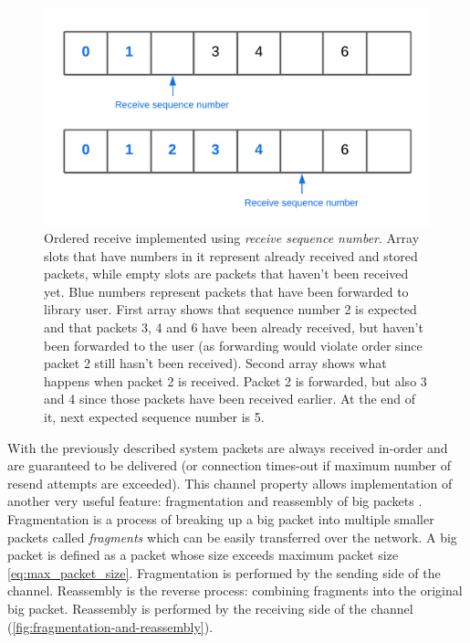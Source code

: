 \documentclass[times, utf8, diplomski]{fer}
\begin{document}
\begin{figure}[H]
	\centering
	\includegraphics[scale=0.25]{Ordered-receive}
	\caption{Ordered receive implemented using \textit{receive sequence number}. Array slots that have numbers in it represent already received and stored packets, while empty slots are packets that haven't been received yet. Blue numbers represent packets that have been forwarded to library user. First array shows that sequence number 2 is expected and that packets 3, 4 and 6 have been already received, but haven't been forwarded to the user (as forwarding would violate order since packet 2 still hasn't been received). Second array shows what happens when packet 2 is received. Packet 2 is forwarded, but also 3 and 4 since those packets have been received earlier. At the end of it, next expected sequence number is 5.}
	\label{fig:ordered-receive}
\end{figure}

With the previously described system packets are always received in-order and are guaranteed to be delivered (or connection times-out if maximum number of resend attempts are exceeded). This channel property allows implementation of another very useful feature: fragmentation and reassembly of big packets \cite{GafferOnGames:Sending-large-blocks-of-data}.\\

Fragmentation is a process of breaking up a big packet into multiple smaller packets called \textit{fragments} which can be easily transferred over the network. A big packet is defined as a packet whose size exceeds maximum packet size \eqref{eq:max_packet_size}. Fragmentation is performed by the sending side of the channel. Reassembly is the reverse process: combining fragments into the original big packet. Reassembly is performed by the receiving side of the channel (\ref{fig:fragmentation-and-reassembly}). \\
\end{document}
